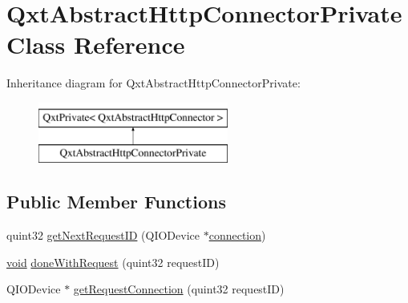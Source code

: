 \hypertarget{class_qxt_abstract_http_connector_private}{\section{Qxt\-Abstract\-Http\-Connector\-Private Class Reference}
\label{class_qxt_abstract_http_connector_private}
}
Inheritance diagram for Qxt\-Abstract\-Http\-Connector\-Private\-:\begin{figure}[H]
\begin{center}
\leavevmode
\includegraphics[height=2.000000cm]{class_qxt_abstract_http_connector_private}
\end{center}
\end{figure}
\subsection*{Public Member Functions}
\begin{DoxyCompactItemize}
\item 
quint32 \hyperlink{class_qxt_abstract_http_connector_private_a4e17beb44935833b0f4214aba9f425cc}{get\-Next\-Request\-I\-D} (Q\-I\-O\-Device $\ast$\hyperlink{group___i_p_conn_plugin_ga75cb9b33b52928c030806876f2c2f439}{connection})
\item 
\hyperlink{group___u_a_v_objects_plugin_ga444cf2ff3f0ecbe028adce838d373f5c}{void} \hyperlink{class_qxt_abstract_http_connector_private_a417dfedbe7aa134e0d8afb32a60181c8}{done\-With\-Request} (quint32 request\-I\-D)
\item 
Q\-I\-O\-Device $\ast$ \hyperlink{class_qxt_abstract_http_connector_private_adfbdd371a46e2fc97d7f0e90d556a945}{get\-Request\-Connection} (quint32 request\-I\-D)
\end{DoxyCompactItemize}
